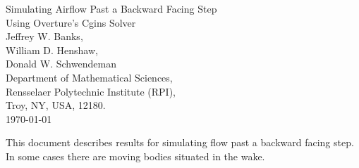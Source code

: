 \documentclass[11pt]{article}
\newcommand{\grad}{\nabla}
\begin{document}


\def\comma  {~~~,~~}
\newcommand{\uvd}{\mathbf{U}}
\def\ud     {{    U}}
\def\pd     {{    P}}
\def\calo{{\cal O}}

\newcommand{\mbar}{\bar{m}}
\newcommand{\Rbar}{\bar{R}}
\newcommand{\Ru}{R_u}         %
\newcommand{\Div}{\grad\cdot}
\newcommand{\tauv}{\boldsymbol{\tau}}
\newcommand{\thetav}{\boldsymbol{\theta}}

\newcommand{\Omegav}{\boldsymbol{\Omega}}
\newcommand{\omegav}{\boldsymbol{\omega}}
\newcommand{\sigmav}{\boldsymbol{\sigma}}
\newcommand{\cm}{{\rm cm}}

\newcommand{\ds}{\Delta s}
\newcommand{\dsbl}{\ds_{\rm bl}}


\newcommand{\sumi}{\sum_{i=1}^n}
\newcommand{\dt}{{\Delta t}}

\def\ff {\tt} %


\newcommand{\Bc}{{\mathcal B}}
\newcommand{\Dc}{{\mathcal D}}
\newcommand{\Ec}{{\mathcal E}}
\newcommand{\Fc}{{\mathcal F}}
\newcommand{\Gc}{{\mathcal G}}
\newcommand{\Hc}{{\mathcal H}}
\newcommand{\Ic}{{\mathcal I}}
\newcommand{\Jc}{{\mathcal J}}
\newcommand{\Lc}{{\mathcal L}}
\newcommand{\Nc}{{\mathcal N}}
\newcommand{\Pc}{{\mathcal P}}
\newcommand{\Rc}{{\mathcal R}}
\newcommand{\Sc}{{\mathcal S}}

\newcommand{\bogus}[1]{}  %

\vspace{5\baselineskip}
\begin{flushleft}
{\LARGE
Simulating Airflow Past a Backward Facing Step \\
Using Overture's Cgins Solver\\
}
\vspace{2\baselineskip}
Jeffrey W. Banks,  \\
William D. Henshaw, \\
Donald W. Schwendeman \\
% 
\vspace{2\baselineskip}
% 
Department of Mathematical Sciences, \\
Rensselaer Polytechnic Institute (RPI), \\
Troy, NY, USA, 12180. \\
\vspace{\baselineskip}
\today\\

\vspace{4\baselineskip}


This document describes results for simulating flow past a backward facing step.
In some cases there are moving bodies situated in the wake.

\end{flushleft}
\end{document}
